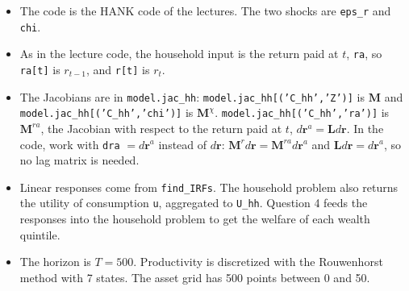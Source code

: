 \begin{itemize}
\item The code is the HANK code of the lectures. The two shocks are \texttt{eps\_r} and \texttt{chi}.
\item As in the lecture code, the household input is the return paid at $t$, \texttt{ra}, so \texttt{ra[t]} is $r_{t-1}$, and \texttt{r[t]} is $r_{t}$.
\item The Jacobians are in \texttt{model.jac\_hh}: \texttt{model.jac\_hh[('C\_hh','Z')]} is $\boldsymbol{M}$ and \texttt{model.jac\_hh[('C\_hh','chi')]} is $\boldsymbol{M}^{\chi}$. \texttt{model.jac\_hh[('C\_hh','ra')]} is $\boldsymbol{M}^{ra}$, the Jacobian with respect to the return paid at $t$, $d\boldsymbol{r}^{a}=\boldsymbol{L}d\boldsymbol{r}$. In the code, work with \texttt{dra} $=d\boldsymbol{r}^{a}$ instead of $d\boldsymbol{r}$: $\boldsymbol{M}^{r}d\boldsymbol{r}=\boldsymbol{M}^{ra}d\boldsymbol{r}^{a}$ and $\boldsymbol{L}d\boldsymbol{r}=d\boldsymbol{r}^{a}$, so no lag matrix is needed.
\item Linear responses come from \texttt{find\_IRFs}. The household problem also returns the utility of consumption \texttt{u}, aggregated to \texttt{U\_hh}. Question 4 feeds the responses into the household problem to get the welfare of each wealth quintile.
\item The horizon is $T=500$. Productivity is discretized with the Rouwenhorst method with 7 states. The asset grid has 500 points between 0 and 50.
\end{itemize}

